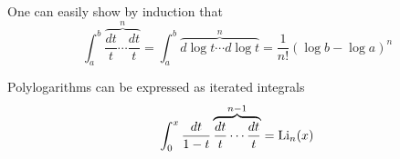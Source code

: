 
\begin{example}\label{ex: int dlog^n}
One can easily show by induction that
\begin{equation}
\int_a^b\overbrace{\frac{dt}{t}\cdots\frac{dt}{t}}^n=\int_a^b\overbrace{d\log t\cdots d\log t}^n=\dfrac{1}{n!}(\log b-\log a)^n
\end{equation}
\end{example}

\begin{example}
Polylogarithms can be expressed as iterated integrals
\begin{equation}
\int_0^x\frac{dt}{1-t}\overbrace{\frac{dt}{t}\cdots\frac{dt}{t}}^{n-1}=\operatorname{Li}_n(x)
\end{equation}
\end{example}

